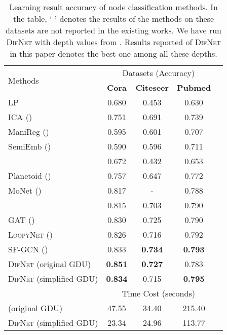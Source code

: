 \documentclass{article}
\newcommand{\our}{\textsc{DifNet}}
\newcommand{\gdu}{\textsc{GDU}}
\newcommand{\loopy}{\textsc{LoopyNet}}
\newcommand{\gcn}{\textsc{GCN}}
\newcommand{\gat}{\textsc{GAT}}
\begin{document}
\begin{table}[t]
\caption{Learning result accuracy of node classification methods. In the table, `-' denotes the results of the methods on these datasets are not reported in the existing works. We have run {\our} with depth values from . Results reported of {\our} in this paper denotes the best one among all these depths.}\label{tab:complete_performance_comparison}
\centering
\small
\setlength{\tabcolsep}{4pt}
\begin{tabular}{l c c c c }
\toprule
 \multirow{2}{*}{Methods}  & \multicolumn{3}{c}{Datasets (Accuracy)} \\
\cline{2-4}
\addlinespace[0.05cm]
& \textbf{Cora} & \textbf{Citeseer} & \textbf{Pubmed} \\
\hline
\addlinespace[0.05cm]

{LP } &0.680 &0.453 &0.630  \\
{ICA (\cite{LG03})} &0.751  &0.691  &0.739   \\
{ManiReg (\cite{BNS06})} &0.595  &0.601  &0.707   \\
{SemiEmb (\cite{WRC08})} &0.590  &0.596  &0.711  \\
\hline
\addlinespace[0.05cm]
{DeepWalk (\cite{PAS14})} &0.672  &0.432  &0.653   \\
{Planetoid (\cite{YCS16})} &0.757  &0.647  &0.772  \\
{MoNet (\cite{MBMRSB16})} &0.817  &-  &0.788  \\
\hline
\addlinespace[0.05cm]
{{\gcn} (\cite{Kipf_Semi_CORR_16})} &0.815  &0.703  &0.790   \\
{{\gat} (\cite{Velickovic_Graph_ICLR_18})} &0.830  &0.725  &0.790  \\
{{\loopy} (\cite{loopynet})} &0.826  &0.716  &0.792  \\
{SF-GCN (\cite{DBLP:journals/corr/abs-1907-02586})} &0.833  &\textbf{0.734}  &\textbf{0.793}   \\
\hline
\addlinespace[0.05cm]

{\our} (original {\gdu}) &\textbf{0.851}  &\textbf{0.727}  &{0.783}  \\
{\our} (simplified {\gdu}) &\textbf{0.834}  &{0.715}  &\textbf{0.795}  \\

\bottomrule
\toprule
\addlinespace[0.1cm]
& \multicolumn{3}{c}{Time Cost (seconds)} \\
\cline{2-4}
\addlinespace[0.05cm]
{\our} (original {\gdu}) &47.55  &34.40  &215.40 \\
{\our} (simplified {\gdu}) &23.34  &24.96  &113.77 \\
\bottomrule
\end{tabular} \vspace{-10pt}
\end{table}
\end{document}
